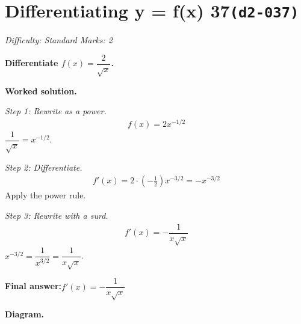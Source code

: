 \documentclass[11pt]{article}
\newcommand{\question}[1]{\par\medskip\noindent\textbf{#1}\par}
\begin{document}
\section*{Differentiating y = f(x) 37\quad\small\texttt{(d2-037)}}
\textit{Difficulty: Standard \quad\textbar\quad Marks: 2}

\question{Differentiate \( f(x) = \dfrac{2}{\sqrt{x}} \).}

\textbf{Worked solution.}

\textit{Step 1: Rewrite as a power.}
\[\begin{gathered}
f(x) = 2x^{-1/2}
\end{gathered}\]
\( \dfrac{1}{\sqrt{x}} = x^{-1/2} \).

\textit{Step 2: Differentiate.}
\[\begin{gathered}
f'(x) = 2 \cdot \left(-\tfrac{1}{2}\right) x^{-3/2} = -x^{-3/2}
\end{gathered}\]
Apply the power rule.

\textit{Step 3: Rewrite with a surd.}
\[\begin{gathered}
f'(x) = -\dfrac{1}{x\sqrt{x}}
\end{gathered}\]
\( x^{-3/2} = \dfrac{1}{x^{3/2}} = \dfrac{1}{x\sqrt{x}} \).

\begin{answerbox}
\textbf{Final answer:}\quad \(\displaystyle  f'(x) = -\dfrac{1}{x\sqrt{x}} \)
\end{answerbox}
\textbf{Diagram.}
\end{document}
